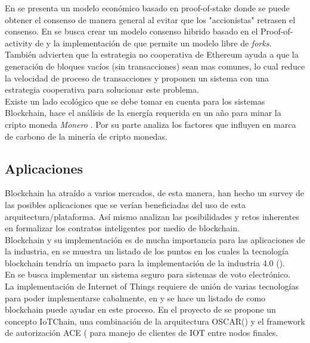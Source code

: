 \documentclass[10pt,letterpaper]{article}
\begin{document}
En \cite{saleh2020blockchain} se presenta un modelo económico basado en proof-of-stake donde se puede obtener el consenso de manera general al evitar que los "accionistas" retrasen el consenso. En \cite{liu2019fork} se busca crear un modelo consenso hibrido basado en el  Proof-of-activity  de \cite{bentov2014proof} y la implementación de \cite{pass2017hybrid}  que permite un modelo libre de \textit{forks}.\\

También \cite{yoo2018promoting} advierten que la estrategia no cooperativa de Ethereum ayuda a que la generación de bloques vacíos (sin transacciones) sean mas comunes, lo cual reduce la velocidad de proceso de transacciones y proponen un sistema con una estrategia cooperativa para solucionar este problema.\\

Existe un lado ecológico que se debe tomar en cuenta para los sistemas Blockchain,\cite{li2019energy}  hace el análisis de la energía requerida en un año para minar la cripto moneda \textit{Monero} \cite{Monero}. Por su parte \cite{krause2018quantification} analiza los factores que influyen en marca de carbono de la minería de cripto monedas.\\


\subsection{Aplicaciones}


Blockchain ha atraído a varios mercados, de esta manera, \cite{cai2018decentralized} han hecho un survey de las posibles aplicaciones que se verían beneficiadas del uso de esta arquitectura/plataforma. Así mismo \cite{singh2020blockchain} analizan las posibilidades y retos inherentes en formalizar los contratos inteligentes por medio de blockchain.\\
 
Blockchain y su implementación es de mucha importancia para las aplicaciones de la industria, en \cite{mohamed2019applying} se muestra un listado de los puntos en los cuales la tecnología blockchain tendría un impacto para la implementación de la industria 4.0 (\cite{lasi2014industry}).\\

En \cite{yi2019securing} se busca implementar un sistema seguro para sistemas de voto electrónico.\\

La implementación de Internet of Things requiere de unión de varias tecnologías para poder implementarse cabalmente, en \cite{dai2019blockchain} y \cite{wang2019survey} se hace un listado de como blockchain puede ayudar en este proceso. En el proyecto de \cite{alphand2018iotchain} se propone un concepto IoTChain, una combinación de la arquitectura OSCAR(\cite{vuvcinic2015oscar}) y el framework de autorización ACE (\cite{seitz2017authentication} para manejo de clientes de IOT entre nodos finales.\\
\end{document}
